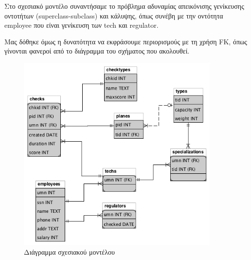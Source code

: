 \documentclass[a4paper]{article}
\begin{document}
Στο σχεσιακό μοντέλο συναντήσαμε το πρόβλημα αδυναμίας απεικόνισης
γενίκευσης οντοτήτων (superclass-subclass) και κάλυψης, όπως συνέβη με την
οντότητα employee που είναι γενίκευση των tech και regulator.

Μας δόθηκε όμως η δυνατότητα να εκφράσουμε περιορισμούς με τη χρήση FK, όπως
γίνονται φανεροί από το διάγραμμα του σχήματος που ακολουθεί.

\begin{figure}[h]
\centering
\includegraphics[width=0.9\textwidth]{../R_model/r-db.png}
\caption{Διάγραμμα σχεσιακού μοντέλου}
\end{figure}


\end{document}
